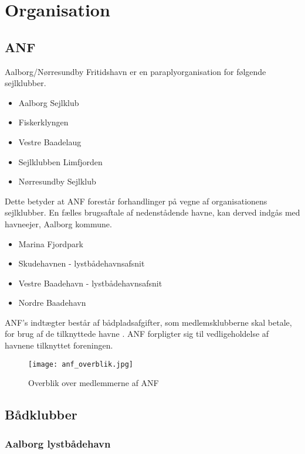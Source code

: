 \section{Organisation}

\subsection{ANF}

Aalborg/Nørresundby Fritidshavn er en paraplyorganisation for følgende sejlklubber. \cite{anf_havnereglement}
\begin{itemize}
	\item Aalborg Sejlklub
	\item Fiskerklyngen
	\item Vestre Baadelaug
	\item Sejlklubben Limfjorden
	\item Nørresundby Sejlklub
\end{itemize}
 
 Dette betyder at ANF forestår forhandlinger på vegne af organisationens sejlklubber. En fælles brugsaftale af nedenstådende havne, kan derved indgås med havneejer, Aalborg kommune.

 \begin{itemize}
 	\item Marina Fjordpark
 	\item Skudehavnen - lystbådehavnsafsnit
 	\item Vestre Baadehavn - lystbådehavnsafsnit
 	\item Nordre Baadehavn
 \end{itemize}

 ANF's indtægter består af bådpladsafgifter, som medlemsklubberne skal betale, for brug af de tilknyttede havne \cite{anf_budget_2013}. ANF forpligter sig til vedligeholdelse af havnene tilknyttet foreningen.

 \cite{anf_brugsaftale_2012}

 \begin{figure}
 	\begin{center}
 		\texttt{[image: anf\_overblik.jpg]}
 	\end{center}
 	\caption{Overblik over medlemmerne af ANF}
 	\label{fig:anf_overblik}
 \end{figure}

\subsection{Bådklubber}

\subsubsection{Aalborg lystbådehavn}